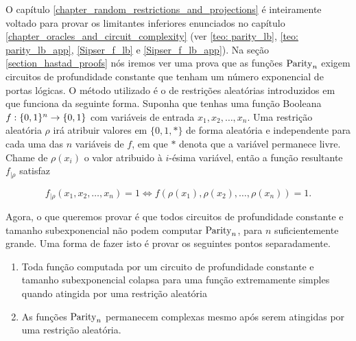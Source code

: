 O capítulo \ref{chapter_random_restrictions_and_projections} é inteiramente voltado para provar os limitantes inferiores enunciados no capítulo \ref{chapter_oracles_and_circuit_complexity} (ver \ref{teo: parity_lb}, \ref{teo: parity_lb_app}, \ref{Sipser_f_lb} e \ref{Sipser_f_lb_app}). Na seção \ref{section_hastad_proofs} nós iremos ver uma prova que as funções $\text{Parity}_{n}$ exigem circuitos de profundidade constante que tenham um número exponencial de portas lógicas. O método utilizado é o de restrições aleatórias introduzidos em~\cite{subbotovskaya1961realizations} que funciona da seguinte forma. Suponha que tenhas uma função Booleana $f: \{0, 1\}^{n} \to \{0, 1\}$ com variáveis de entrada $x_{1}, x_{2}, \dots, x_{n}$. Uma restrição aleatória $\rho$ irá atribuir valores em $\{0, 1, *\}$ de forma aleatória e independente para cada uma das $n$ variáveis de $f$, em que $*$ denota que a variável permanece livre. Chame de $\rho(x_{i})$ o valor atribuido à $i$-ésima variável, então a função resultante $f_{\lvert \rho}$ satisfaz

\begin{equation*} 
    f_{\lvert \rho}(x_{1}, x_{2}, \dots, x_{n}) = 1 \iff f(\rho(x_{1}), \rho(x_{2}), \dots, \rho(x_{n})) = 1.
\end{equation*}

Agora, o que queremos provar é que todos circuitos de profundidade constante e tamanho subexponencial não podem computar $\text{Parity}_{n}$, para $n$ suficientemente grande. Uma forma de fazer isto é provar os seguintes pontos separadamente.

\begin{enumerate}

    \item Toda função computada por um circuito de profundidade constante e tamanho subexponencial colapsa para uma função extremamente simples quando atingida por uma restrição aleatória
    
    \item As funções $\text{Parity}_{n}$ permanecem complexas mesmo após serem atingidas por uma restrição aleatória.

\end{enumerate}


